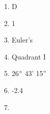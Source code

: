 \documentclass[../uilmath.tex]{subfiles}
\begin{document}
\begin{enumerate}[label=\bfseries\arabic*.]
    \item %
    D 

    \item %
    1 

    \item %
    Euler's 

    \item %
    Quadrant I 

    \item %
    26$\degree$ 43' 15''

    \item %
    -2.4

    \item %
    
\end{enumerate}
\end{document}
